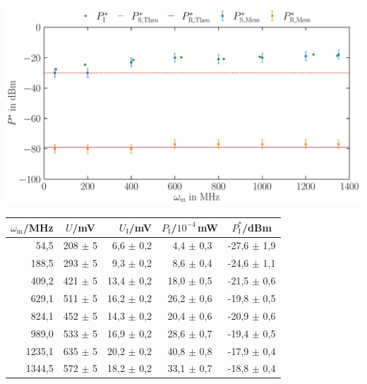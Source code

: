 \begin{center}
    \captionsetup{type=figure}
    \includegraphics[scale=0.4]{Bilder/Auswertung/62/Signal-Rausch.pdf}
    \label{fig:specAnalVergleich}
\end{center}

\begin{center}
    \captionsetup{type=table}
    \begin{tabular}{r | c r | c c }
        $\omega_\mathrm{m}$/MHz & $U$/mV & $U_\mathrm{I}$/mV & $P_\mathrm{I}$/$10^{-4}$\,mW & $P^*_\mathrm{I}$/dBm \\ \hline
        54,5   & 208 $\pm$ 5 & 6,6  $\pm$ 0,2 & ~4,4 $\pm$ 0,3 & -27,6 $\pm$ 1,9 \\
        188,5  & 293 $\pm$ 5 & 9,3  $\pm$ 0,2 & ~8,6 $\pm$ 0,4 & -24,6 $\pm$ 1,1 \\
        409,2  & 421 $\pm$ 5 & 13,4 $\pm$ 0,2 & 18,0 $\pm$ 0,5 & -21,5 $\pm$ 0,6 \\
        629,1  & 511 $\pm$ 5 & 16,2 $\pm$ 0,2 & 26,2 $\pm$ 0,6 & -19,8 $\pm$ 0,5 \\
        824,1  & 452 $\pm$ 5 & 14,3 $\pm$ 0,2 & 20,4 $\pm$ 0,6 & -20,9 $\pm$ 0,6 \\
        989,0  & 533 $\pm$ 5 & 16,9 $\pm$ 0,2 & 28,6 $\pm$ 0,7 & -19,4 $\pm$ 0,5 \\
        1235,1 & 635 $\pm$ 5 & 20,2 $\pm$ 0,2 & 40,8 $\pm$ 0,8 & -17,9 $\pm$ 0,4 \\
        1344,5 & 572 $\pm$ 5 & 18,2 $\pm$ 0,2 & 33,1 $\pm$ 0,7 & -18,8 $\pm$ 0,4 \\
    \end{tabular}
    \label{tab:konversionsverluste}
\end{center}

